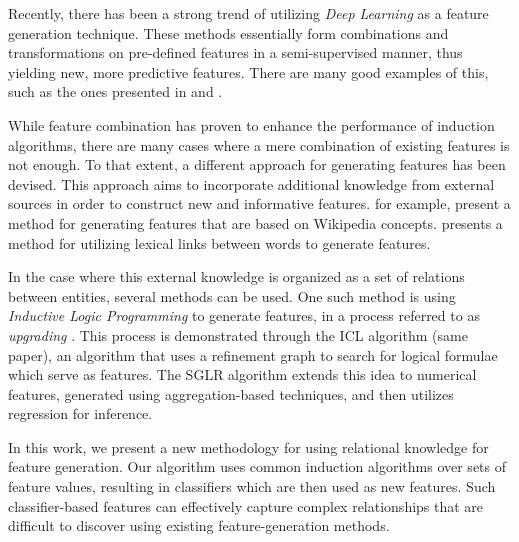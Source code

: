 \documentclass{article}
\theoremstyle{definition}
\begin{document}
Recently, there has been a strong trend of utilizing \emph{Deep Learning} \citep{lecun1998gradient, bengio2009learning} as a feature generation technique. These methods essentially form combinations and transformations on pre-defined features in a semi-supervised manner, thus yielding new, more predictive features.
There are many good examples of this, such as the ones presented in \citet{plotz2011feature} and \citet{kim2013deep}.

While feature combination has proven to enhance the performance of induction algorithms, there are many cases where a mere combination of existing features is not enough.  To that extent, a different approach for generating features has been devised.  This approach aims to incorporate additional knowledge from external sources in order to construct new and informative features.
\citet{gabrilovich2006overcoming} for example, present a method for generating features that are based on Wikipedia concepts. \citet{jarmasz2012roget} presents a method for utilizing lexical links between words to generate features.

In the case where this external knowledge is organized as a set of relations between entities, several methods can be used. One such method is using \emph{Inductive Logic Programming} \citep{muggleton1991inductive} to generate features, in a process referred to as \emph{upgrading} \citep{van2001upgrade}. This process is demonstrated through the ICL algorithm (same paper), an algorithm that uses a refinement graph to search for logical formulae which serve as features. The SGLR algorithm \citep{popescul200716} extends this idea to numerical features, generated using aggregation-based techniques, and then utilizes regression for inference.

In this work, we present a new methodology for using relational knowledge for feature generation.  Our algorithm uses common induction algorithms over sets of feature values, resulting in classifiers which are then used as new features.
Such classifier-based features can effectively capture complex relationships that are difficult to discover using existing feature-generation methods.
\end{document}
